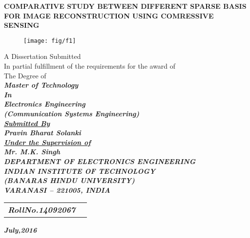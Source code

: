 
\thispagestyle{empty}
\vspace{.2cm}
\begin{center}
\large{\textbf{COMPARATIVE STUDY BETWEEN DIFFERENT SPARSE BASIS FOR IMAGE RECONSTRUCTION USING COMRESSIVE SENSING}}\\[2pc]
\begin{figure}[H]
\centering
\texttt{[image: fig/f1]}
\label{fig1}
\end{figure}
\vspace{.1cm}
\Large{A Dissertation Submitted}\\
\large{In partial fulfillment of the requirements for the award of}\\[1pc]
\large{The Degree of}
\large{}\\
\textbf{\textit{{\color{red}Master of Technology}}}\\
\textbf{\textit{{\color{red}In}}}\\
\textbf{\textit{{\color{red}Electronics Engineering}}}\\
\textbf{\textit{{\color{red}(Communication Systems Engineering)}}}\\
\textbf{\textit{{\color{blue}\underline{Submitted By}}}}\\
\textbf{\textit{Pravin Bharat Solanki}}\\
\textbf{\textit{{\color{blue}\underline{Under the Supervision of}}}}\\
\textbf{\textit{Mr. M.K. Singh}}\\
\textbf{\textit{{\color{blue}DEPARTMENT OF ELECTRONICS ENGINEERING}}}\\
\textbf{\textit{{\color{blue}INDIAN INSTITUTE OF TECHNOLOGY}}}\\
\textbf{\textit{{\color{blue}(BANARAS HINDU UNIVERSITY)}}}\\
\textbf{\textit{{\color{blue}VARANASI – 221005, INDIA}}}
\end{center}
\vfill
\begin{minipage}[t]{0.85\linewidth}
\begin{tabular}{ll}
\textbf{\textit{{\color{black}RollNo.14092067}}} 
\end{tabular} 
\end{minipage}
\begin{minipage}[t]{0.85\linewidth}
\textbf{\textit{{\color{black}July,2016}}}
\end{minipage}


